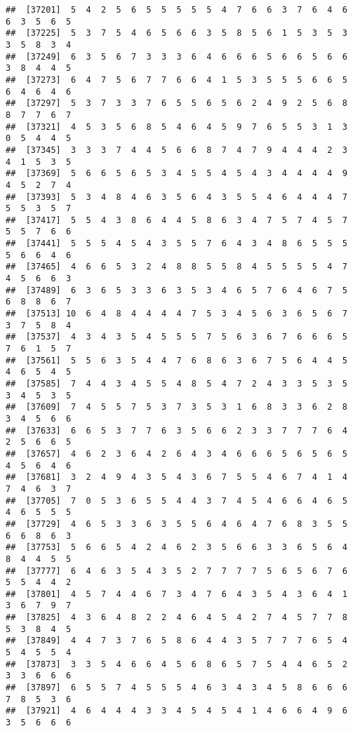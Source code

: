 \documentclass[
]{book}
\begin{document}
\begin{verbatim}
##  [37201]  5  4  2  5  6  5  5  5  5  5  4  7  6  6  3  7  6  4  6  6  3  5  6  5
##  [37225]  5  3  7  5  4  6  5  6  6  3  5  8  5  6  1  5  3  5  3  3  5  8  3  4
##  [37249]  6  3  5  6  7  3  3  3  6  4  6  6  6  5  6  6  5  6  6  3  8  4  4  5
##  [37273]  6  4  7  5  6  7  7  6  6  4  1  5  3  5  5  5  6  6  5  6  4  6  4  6
##  [37297]  5  3  7  3  3  7  6  5  5  6  5  6  2  4  9  2  5  6  8  8  7  7  6  7
##  [37321]  4  5  3  5  6  8  5  4  6  4  5  9  7  6  5  5  3  1  3  0  5  4  4  5
##  [37345]  3  3  3  7  4  4  5  6  6  8  7  4  7  9  4  4  4  2  3  4  1  5  3  5
##  [37369]  5  6  6  5  6  5  3  4  5  5  4  5  4  3  4  4  4  4  9  4  5  2  7  4
##  [37393]  5  3  4  8  4  6  3  5  6  4  3  5  5  4  6  4  4  4  7  5  5  3  5  7
##  [37417]  5  5  4  3  8  6  4  4  5  8  6  3  4  7  5  7  4  5  7  5  5  7  6  6
##  [37441]  5  5  5  4  5  4  3  5  5  7  6  4  3  4  8  6  5  5  5  5  6  6  4  6
##  [37465]  4  6  6  5  3  2  4  8  8  5  5  8  4  5  5  5  5  4  7  4  5  6  6  3
##  [37489]  6  3  6  5  3  3  6  3  5  3  4  6  5  7  6  4  6  7  5  6  8  8  6  7
##  [37513] 10  6  4  8  4  4  4  4  7  5  3  4  5  6  3  6  5  6  7  3  7  5  8  4
##  [37537]  4  3  4  3  5  4  5  5  5  7  5  6  3  6  7  6  6  6  5  7  6  1  5  7
##  [37561]  5  5  6  3  5  4  4  7  6  8  6  3  6  7  5  6  4  4  5  4  6  5  4  5
##  [37585]  7  4  4  3  4  5  5  4  8  5  4  7  2  4  3  3  5  3  5  3  4  5  3  5
##  [37609]  7  4  5  5  7  5  3  7  3  5  3  1  6  8  3  3  6  2  8  3  4  5  6  6
##  [37633]  6  6  5  3  7  7  6  3  5  6  6  2  3  3  7  7  7  6  4  2  5  6  6  5
##  [37657]  4  6  2  3  6  4  2  6  4  3  4  6  6  6  5  6  5  6  5  4  5  6  4  6
##  [37681]  3  2  4  9  4  3  5  4  3  6  7  5  5  4  6  7  4  1  4  7  4  6  3  7
##  [37705]  7  0  5  3  6  5  5  4  4  3  7  4  5  4  6  6  4  6  5  4  6  5  5  5
##  [37729]  4  6  5  3  3  6  3  5  5  6  4  6  4  7  6  8  3  5  5  6  6  8  6  3
##  [37753]  5  6  6  5  4  2  4  6  2  3  5  6  6  3  3  6  5  6  4  8  4  4  5  5
##  [37777]  6  4  6  3  5  4  3  5  2  7  7  7  7  5  6  5  6  7  6  5  5  4  4  2
##  [37801]  4  5  7  4  4  6  7  3  4  7  6  4  3  5  4  3  6  4  1  3  6  7  9  7
##  [37825]  4  3  6  4  8  2  2  4  6  4  5  4  2  7  4  5  7  7  8  5  3  8  4  5
##  [37849]  4  4  7  3  7  6  5  8  6  4  4  3  5  7  7  7  6  5  4  5  4  5  5  4
##  [37873]  3  3  5  4  6  6  4  5  6  8  6  5  7  5  4  4  6  5  2  3  3  6  6  6
##  [37897]  6  5  5  7  4  5  5  5  4  6  3  4  3  4  5  8  6  6  6  7  8  5  3  6
##  [37921]  4  6  4  4  4  3  3  4  5  4  5  4  1  4  6  6  4  9  6  3  5  6  6  6

\end{verbatim}
\end{document}
